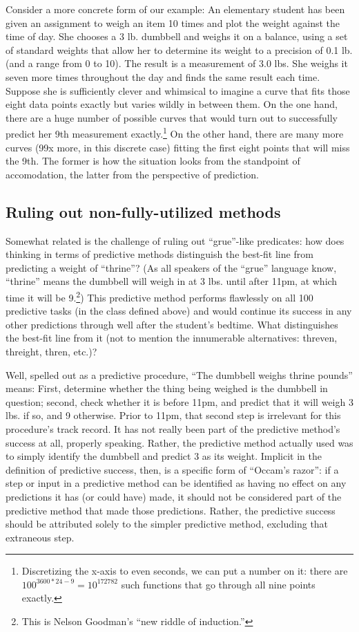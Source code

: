 \documentclass[
  letterpaper,
  DIV=11,
  numbers=noendperiod]{scrartcl}
\theoremstyle{definition}
\theoremstyle{remark}
\begin{document}
Consider a more concrete form of our example: An elementary student has
been given an assignment to weigh an item 10 times and plot the weight
against the time of day. She chooses a 3 lb. dumbbell and weighs it on a
balance, using a set of standard weights that allow her to determine its
weight to a precision of 0.1 lb. (and a range from 0 to 10). The result
is a measurement of 3.0 lbs. She weighs it seven more times throughout
the day and finds the same result each time. Suppose she is sufficiently
clever and whimsical to imagine a curve that fits those eight data
points exactly but varies wildly in between them. On the one hand, there
are a huge number of possible curves that would turn out to successfully
predict her 9th measurement exactly.\footnote{Discretizing the x-axis to
  even seconds, we can put a number on it: there are
  \(100^{3600*24-9}=10^{172782}\) such functions that go through all
  nine points exactly.} On the other hand, there are many more curves
(99x more, in this discrete case) fitting the first eight points that
will miss the 9th. The former is how the situation looks from the
standpoint of accomodation, the latter from the perspective of
prediction.

\subsection{Ruling out non-fully-utilized
methods}\label{ruling-out-non-fully-utilized-methods}

Somewhat related is the challenge of ruling out ``grue''-like
predicates: how does thinking in terms of predictive methods distinguish
the best-fit line from predicting a weight of ``thrine''? (As all
speakers of the ``grue'' language know, ``thrine'' means the dumbbell
will weigh in at 3 lbs. until after 11pm, at which time it will be
9.\footnote{This is Nelson Goodman's ``new riddle of induction.''}) This
predictive method performs flawlessly on all 100 predictive tasks (in
the class defined above) and would continue its success in any other
predictions through well after the student's bedtime. What distinguishes
the best-fit line from it (not to mention the innumerable alternatives:
threven, threight, thren, etc.)?

Well, spelled out as a predictive procedure, ``The dumbbell weighs
thrine pounds'' means: First, determine whether the thing being weighed
is the dumbbell in question; second, check whether it is before 11pm,
and predict that it will weigh 3 lbs. if so, and 9 otherwise. Prior to
11pm, that second step is irrelevant for this procedure's track record.
It has not really been part of the predictive method's success at all,
properly speaking. Rather, the predictive method actually used was to
simply identify the dumbbell and predict 3 as its weight. Implicit in
the definition of predictive success, then, is a specific form of
``Occam's razor'': if a step or input in a predictive method can be
identified as having no effect on any predictions it has (or could have)
made, it should not be considered part of the predictive method that
made those predictions. Rather, the predictive success should be
attributed solely to the simpler predictive method, excluding that
extraneous step.
\end{document}
